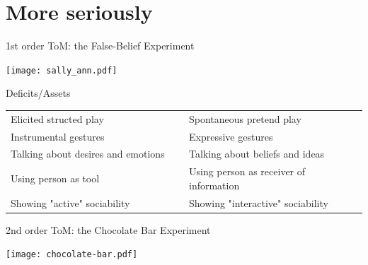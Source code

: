 \documentclass[compress]{beamer}
\begin{document}

\section{More seriously}

{
\begin{frame}{1st order ToM: the False-Belief Experiment}
    \begin{center}
    \texttt{[image: sally\_ann.pdf]}
    \end{center}

\end{frame}
}

{ 
\begin{frame}{Deficits/Assets}
    \centering
    \begin{tabular}{p{0.5\linewidth}p{0.5\linewidth}}
        \toprule
        Elicited structed play & Spontaneous pretend play \\
        Instrumental gestures & Expressive gestures \\
        Talking about desires and emotions & Talking about beliefs and ideas \\
        Using person as tool & Using person as receiver of information \\
        Showing "active" sociability & Showing "interactive" sociability \\
        \bottomrule
    \end{tabular}
\end{frame}
}



{
\begin{frame}{2nd order ToM: the Chocolate Bar Experiment}
    \begin{center}
    \texttt{[image: chocolate-bar.pdf]}
    \end{center}

\end{frame}
}
\end{document}
